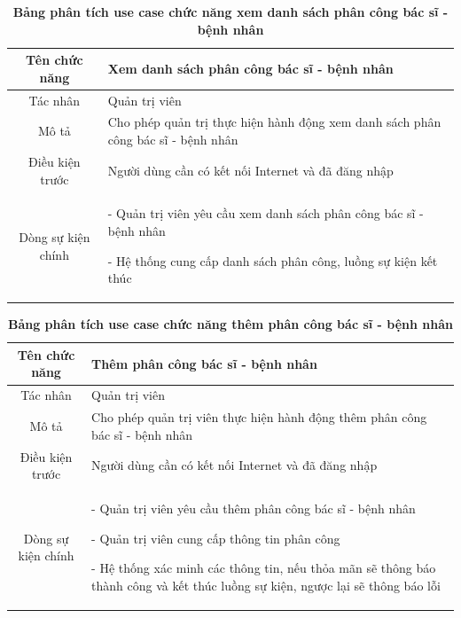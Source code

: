   \begin{table}[H]
    \caption{\bfseries \fontsize{12pt}{0pt}\selectfont Bảng phân tích use case chức năng xem danh sách phân công bác sĩ - bệnh nhân}
    \centering
    \begin{tabularx}{0.9\textwidth}{|c|X|}
      \hline
      \textbf{Tên chức năng} & \textbf{Xem danh sách phân công bác sĩ - bệnh nhân} \\
      \hline
      Tác nhân & Quản trị viên \\
      \hline
      Mô tả & Cho phép quản trị thực hiện hành động xem danh sách phân công bác sĩ - bệnh nhân \\
      \hline
      Điều kiện trước & Người dùng cần có kết nối Internet và đã đăng nhập \\
      \hline
      Dòng sự kiện chính & 
        - Quản trị viên yêu cầu xem danh sách phân công bác sĩ - bệnh nhân
        
        - Hệ thống cung cấp danh sách phân công, luồng sự kiện kết thúc         
        \\
      \hline
    \end{tabularx}
  \end{table}

  \begin{table}[H]
    \caption{\bfseries \fontsize{12pt}{0pt}\selectfont Bảng phân tích use case chức năng thêm phân công bác sĩ - bệnh nhân}
    \centering
    \begin{tabularx}{0.9\textwidth}{|c|X|}
      \hline
      \textbf{Tên chức năng} & \textbf{Thêm phân công bác sĩ - bệnh nhân} \\
      \hline
      Tác nhân & Quản trị viên \\
      \hline
      Mô tả & Cho phép quản trị viên thực hiện hành động thêm phân công bác sĩ - bệnh nhân \\
      \hline
      Điều kiện trước & Người dùng cần có kết nối Internet và đã đăng nhập \\
      \hline
      Dòng sự kiện chính & 
        - Quản trị viên yêu cầu thêm phân công bác sĩ - bệnh nhân

        - Quản trị viên cung cấp thông tin phân công

        - Hệ thống xác minh các thông tin, nếu thỏa mãn sẽ thông báo thành công và kết thúc luồng sự kiện, ngược lại 
        sẽ thông báo lỗi         
        \\
      \hline
    \end{tabularx}
  \end{table}

